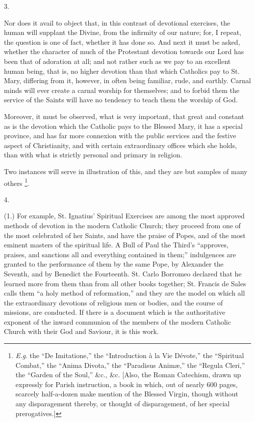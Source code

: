 3.

Nor does it avail to object that, in this contrast of devotional
exercises, the human will supplant the Divine, from the infirmity of
our nature; for, I repeat, the question is one of fact, whether it has
done so. And next it must be asked, whether the character of much of
the Protestant devotion towards our Lord has been that of adoration at
all; and not rather such as we pay to an excellent human being, that
is, no higher devotion than that which Catholics pay to St. Mary,
differing from it, however, in often being familiar, rude, and
earthly. Carnal minds will ever create a carnal worship for
themselves; and to forbid them the service of the Saints will have no
tendency to teach them the worship of God.

Moreover, it must be observed, what is very important, that great
and constant as is the devotion which the Catholic pays to the Blessed
Mary, it has a special province, and has far more connexion with the
public services and the festive aspect of Christianity, and with
certain extraordinary offices which she holds, than with what is
strictly personal and primary in religion.

Two instances will serve in illustration of this, and they are but
samples of many others \footnote{\emph{E.g}. the ``De Imitatione,''
the ``Introduction à la Vie Dévote,'' the ``Spiritual
Combat,'' the ``Anima Divota,'' the ``Paradisus Animæ,''
the ``Regula Cleri,'' the ``Garden of the Soul,''
\&c., \&c. [Also, the Roman Catechism, drawn up expressly for
Parish instruction, a book in which, out of nearly 600 pages, scarcely
half-a-dozen make mention of the Blessed Virgin, though without any
disparagement thereby, or thought of disparagement, of her special
prerogatives.]}.

4.

(1.) For example, St. Ignatius' Spiritual Exercises are among the
most approved methods of devotion in the modern Catholic Church; they
proceed from one of the most celebrated of her Saints, and have the
praise of Popes, and of the most eminent masters of the spiritual
life. A Bull of Paul the Third's ``approves, praises, and
sanctions all and everything contained in them;'' indulgences are
granted to the performance of them by the same Pope, by Alexander the
Seventh, and by Benedict the Fourteenth. St. Carlo Borromeo declared
that he learned more from them than from all other books together; St.
Francis de Sales calls them ``a holy method of reformation,''
and they are the model on which all the extraordinary devotions of
religious men or bodies, and the course of missions, are conducted. If
there is a document which is the authoritative exponent of the inward
communion of the members of the modern Catholic Church with their God
and Saviour, it is this work.


